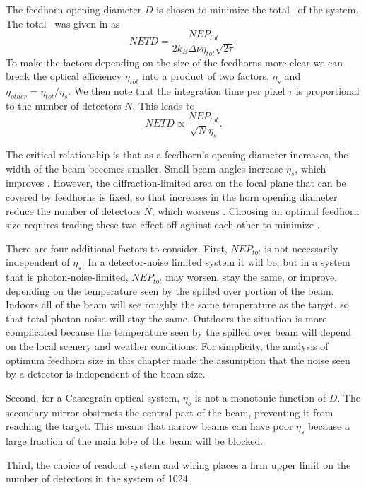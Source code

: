 The feedhorn opening diameter $D$ is chosen to minimize the total \NETD\ of the system.
The total \NETD\ was given in  as
\begin{equation}
    NETD = \frac{NEP_{tot}}{2 k_B \Delta \nu \eta_{tot} \sqrt{2 \tau}}.
\end{equation}
To make the factors depending on the size of the feedhorns more clear we can break the optical efficiency $\eta_{tot}$ into a product of two factors, $\eta_s$ and $\eta_{other} = \eta_{tot} / \eta_s$.
We then note that the integration time per pixel $\tau$ is proportional to the number of detectors $N$.
This leads to
\begin{equation}
    NETD \propto \frac{NEP_{tot}}{\sqrt{N}\eta_s}.
\end{equation}

The critical relationship is that as a feedhorn's opening diameter increases, the width of the beam becomes smaller.
Small beam angles increase $\eta_s$, which improves \NETD.
However, the diffraction-limited area on the focal plane that can be covered by feedhorns is fixed, so that increases in the horn opening diameter reduce the number of detectors $N$, which worsens \NETD.
Choosing an optimal feedhorn size requires trading these two effect off against each other to minimize \NETD.

There are four additional factors to consider.
First, $NEP_{tot}$ is not necessarily independent of $\eta_s$.
In a detector-noise limited system it will be, but in a system that is photon-noise-limited, $NEP_{tot}$ may worsen, stay the same, or improve, depending on the temperature seen by the spilled over portion of the beam.
Indoors all of the beam will see roughly the same temperature as the target, so that total photon noise will stay the same.
Outdoors the situation is more complicated because the temperature seen by the spilled over beam will depend on the local scenery and weather conditions.
For simplicity, the analysis of optimum feedhorn size in this chapter made the assumption that the noise seen by a detector is independent of the beam size.

Second, for a Cassegrain optical system, $\eta_s$ is not a monotonic function of $D$.
The secondary mirror obstructs the central part of the beam, preventing it from reaching the target.
This means that narrow beams can have poor $\eta_s$ because a large fraction of the main lobe of the beam will be blocked.

Third, the choice of readout system and wiring places a firm upper limit on the number of detectors in the system of 1024.

